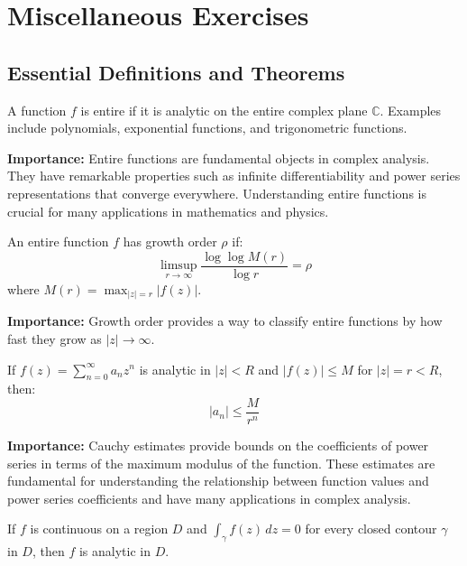 \section{Miscellaneous Exercises}

\subsection*{Essential Definitions and Theorems}

\begin{definition}
A function $f$ is entire if it is analytic on the entire complex plane $\mathbb{C}$. Examples include polynomials, exponential functions, and trigonometric functions.
\end{definition}

\noindent\textbf{Importance:} Entire functions are fundamental objects in complex analysis. They have remarkable properties such as infinite differentiability and power series representations that converge everywhere. Understanding entire functions is crucial for many applications in mathematics and physics.



\begin{definition}
An entire function $f$ has growth order $\rho$ if:
\[\limsup_{r \to \infty} \frac{\log \log M(r)}{\log r} = \rho\]
where $M(r) = \max_{|z| = r} |f(z)|$.
\end{definition}

\noindent\textbf{Importance:} Growth order provides a way to classify entire functions by how fast they grow as $|z| \to \infty$.

\begin{theorem}
If $f(z) = \sum_{n=0}^{\infty} a_n z^n$ is analytic in $|z| < R$ and $|f(z)| \leq M$ for $|z| = r < R$, then:
\[|a_n| \leq \frac{M}{r^n}\]
\end{theorem}

\noindent\textbf{Importance:} Cauchy estimates provide bounds on the coefficients of power series in terms of the maximum modulus of the function. These estimates are fundamental for understanding the relationship between function values and power series coefficients and have many applications in complex analysis.



\begin{theorem}
If $f$ is continuous on a region $D$ and $\int_\gamma f(z) \, dz = 0$ for every closed contour $\gamma$ in $D$, then $f$ is analytic in $D$.
\end{theorem}

